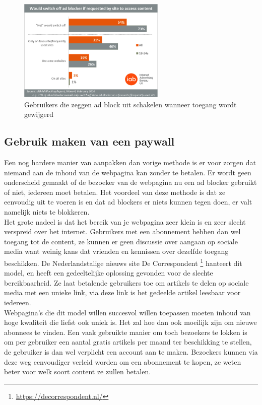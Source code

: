 \documentclass[pdftex,a4paper,12pt,twoside]{report}
\begin{document}
\begin{figure}
\centering
\includegraphics[width=7cm]{img/Adblockblock}
\caption{Gebruikers die zeggen ad block uit schakelen wanneer toegang wordt gewijgerd}
\label{fig: Adblockblock}
\end{figure}

\subsection{Gebruik maken van een paywall}
\label{sec Gebruik maken van een paywall}
Een nog hardere manier van aanpakken dan vorige methode is er voor zorgen dat niemand aan de inhoud van de webpagina kan zonder te betalen. Er wordt geen onderscheid gemaakt of de bezoeker van de webpagina nu een ad blocker gebruikt of niet, iedereen moet betalen. Het voordeel van deze methode is dat ze eenvoudig uit te voeren is en dat ad blockers er niets kunnen tegen doen, er valt namelijk niets te blokkeren.
\\
Het grote nadeel is dat het bereik van je webpagina zeer klein is en zeer slecht verspreid over het internet. Gebruikers met een abonnement hebben dan wel toegang tot de content, ze kunnen er geen discussie over aangaan op sociale media want weinig kans dat vrienden en kennissen over dezelfde toegang beschikken. De Nederlandstalige nieuws site De Correspondent \footnote{\url{https://decorrespondent.nl/}} hanteert dit model, en heeft een gedeeltelijke oplossing gevonden voor de slechte bereikbaarheid. Ze laat betalende gebruikers toe om artikels te delen op sociale media met een unieke link, via deze link is het gedeelde artikel leesbaar voor iedereen.
\\ 
Webpagina's die dit model willen succesvol willen toepassen moeten inhoud van hoge kwaliteit die liefst ook uniek is. Het zal hoe dan ook moeilijk zijn om nieuwe abonnees te vinden. Een vaak gebruikte manier om toch bezoekers te lokken is om per gebruiker een aantal gratis artikels per maand ter beschikking te stellen, de gebruiker is dan wel verplicht een account aan te maken. Bezoekers kunnen via deze weg eenvoudiger verleid worden om een abonnement te kopen, ze weten beter voor welk soort content ze zullen betalen.
\end{document}
